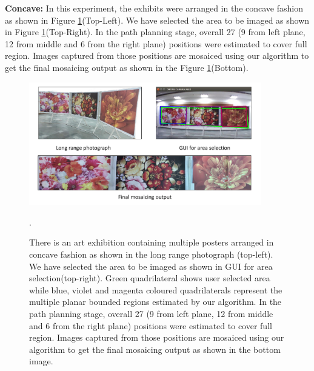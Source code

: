 \textbf{Concave:} In this experiment, the exhibits were arranged in the concave
fashion as shown in Figure \ref{fig:resultConcave}(Top-Left). We have selected
the area to be imaged as shown in Figure \ref{fig:resultConcave}(Top-Right). In
the path planning stage, overall 27 (9 from left plane, 12 from middle and 6
from the right plane) positions were estimated to cover full region. Images captured
from those positions are mosaiced using our algorithm to get the final mosaicing
output as shown in the Figure \ref{fig:resultConcave}(Bottom).

\begin{figure}
\centering
\includegraphics[width=0.9\textwidth]{figures/multiplanar/ConcaveResult.pdf}
\caption[Result: Concave arrangement]{There is an art exhibition containing
multiple posters arranged in concave fashion as shown in the long range photograph (top-left). We have
selected the area to be imaged as shown in GUI for area selection(top-right).
Green quadrilateral shows user selected area while blue, violet and magenta
coloured quadrilaterals represent the multiple planar bounded regions
estimated by our algorithm. In the path planning stage, overall 27 (9 from left
plane, 12 from middle and 6 from the right plane) positions were estimated to cover
full region. Images captured from those positions are mosaiced using our algorithm
to get the final mosaicing output as shown in the bottom image.}
\label{fig:resultConcave}.
\end{figure}

